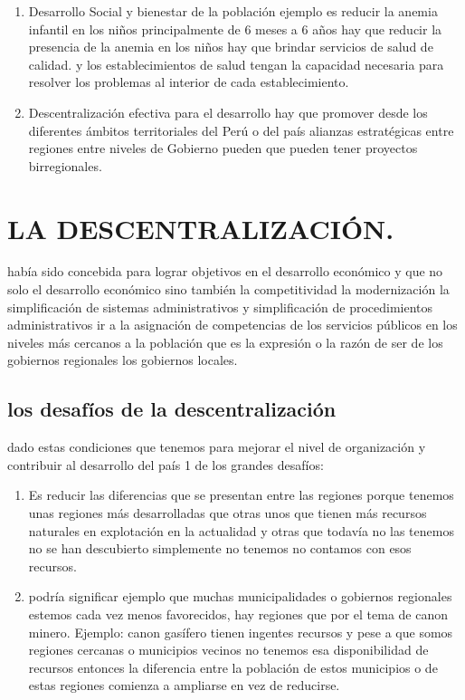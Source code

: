 \documentclass[
  a4paper,
]{article}
\begin{document}
\begin{enumerate}
\def\labelenumi{\arabic{enumi}.}
\setcounter{enumi}{3}
\item
  Desarrollo Social y bienestar de la población ejemplo es reducir la
  anemia infantil en los niños principalmente de 6 meses a 6 años hay
  que reducir la presencia de la anemia en los niños hay que brindar
  servicios de salud de calidad. y los establecimientos de salud tengan
  la capacidad necesaria para resolver los problemas al interior de cada
  establecimiento.
\item
  Descentralización efectiva para el desarrollo hay que promover desde
  los diferentes ámbitos territoriales del Perú o del país alianzas
  estratégicas entre regiones entre niveles de Gobierno pueden que
  pueden tener proyectos birregionales.
\end{enumerate}

\hypertarget{la-descentralizaciuxf3n.}{%
\section{LA DESCENTRALIZACIÓN.}\label{la-descentralizaciuxf3n.}}

había sido concebida para lograr objetivos en el desarrollo económico y
que no solo el desarrollo económico sino también la competitividad la
modernización la simplificación de sistemas administrativos y
simplificación de procedimientos administrativos ir a la asignación de
competencias de los servicios públicos en los niveles más cercanos a la
población que es la expresión o la razón de ser de los gobiernos
regionales los gobiernos locales.

\hypertarget{los-desafuxedos-de-la-descentralizaciuxf3n}{%
\subsection{los desafíos de la
descentralización}\label{los-desafuxedos-de-la-descentralizaciuxf3n}}

dado estas condiciones que tenemos para mejorar el nivel de organización
y contribuir al desarrollo del país 1 de los grandes desafíos:

\begin{enumerate}
\def\labelenumi{\arabic{enumi}.}
\item
  Es reducir las diferencias que se presentan entre las regiones porque
  tenemos unas regiones más desarrolladas que otras unos que tienen más
  recursos naturales en explotación en la actualidad y otras que todavía
  no las tenemos no se han descubierto simplemente no tenemos no
  contamos con esos recursos.
\item
  podría significar ejemplo que muchas municipalidades o gobiernos
  regionales estemos cada vez menos favorecidos, hay regiones que por el
  tema de canon minero. Ejemplo: canon gasífero tienen ingentes recursos
  y pese a que somos regiones cercanas o municipios vecinos no tenemos
  esa disponibilidad de recursos entonces la diferencia entre la
  población de estos municipios o de estas regiones comienza a ampliarse
  en vez de reducirse.
\end{enumerate}
\end{document}
